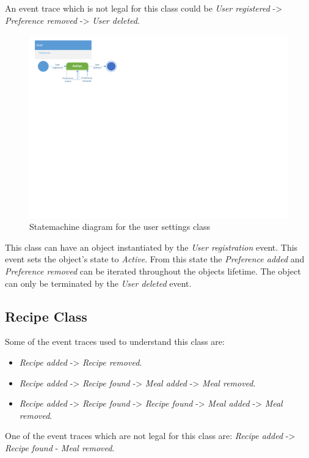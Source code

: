 An event trace which is not legal for this class could be \textit{User registered} -> \textit{Preference removed} -> \textit{User deleted}.

\begin{figure}[H]
	\centering
	\includegraphics[clip=true, trim=0 14cm 5cm 0]{Grafik/FoodPlanner/UserSettings.pdf}
	\caption{Statemachine diagram for the user settings class} \label{UserSettingsClass}
\end{figure}

This class can have an object instantiated by the \textit{User registration} event. This event sets the object's state to \textit{Active}. From this state the \textit{Preference added} and \textit{Preference removed} can be iterated throughout the objects lifetime. The object can only be terminated by the \textit{User deleted} event.


\subsection{Recipe Class}
Some of the event traces used to understand this class are:
\begin{itemize}
	\item \textit{Recipe added} -> \textit{Recipe removed}.
	\item \textit{Recipe added} -> \textit{Recipe found} -> \textit{Meal added} -> \textit{Meal removed}.
	\item \textit{Recipe added} -> \textit{Recipe found} -> \textit{Recipe found} -> \textit{Meal added} -> \textit{Meal removed}.
\end{itemize}

One of the event traces which are not legal for this class are:\textit{ Recipe added }-> \textit{Recipe found} - \textit{Meal removed}.

